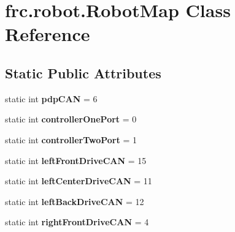 \hypertarget{classfrc_1_1robot_1_1_robot_map}{}\section{frc.\+robot.\+Robot\+Map Class Reference}
\label{classfrc_1_1robot_1_1_robot_map}
\subsection*{Static Public Attributes}
\begin{DoxyCompactItemize}
\item 
\mbox{\label{classfrc_1_1robot_1_1_robot_map_af7db1426412719318df15f9838b70198}} 
static int {\bfseries pdp\+C\+AN} = 6
\item 
\mbox{\label{classfrc_1_1robot_1_1_robot_map_adf0118e5a9de03d6f71ea1e5a6a81cc9}} 
static int {\bfseries controller\+One\+Port} = 0
\item 
\mbox{\label{classfrc_1_1robot_1_1_robot_map_a762ebcaa07378c37d88654506850e07f}} 
static int {\bfseries controller\+Two\+Port} = 1
\item 
\mbox{\label{classfrc_1_1robot_1_1_robot_map_a2e3dbfb148d6fa2b7f430614887217f0}} 
static int {\bfseries left\+Front\+Drive\+C\+AN} = 15
\item 
\mbox{\label{classfrc_1_1robot_1_1_robot_map_a9d04abf669a5ad42cb023e3ff3b56bcd}} 
static int {\bfseries left\+Center\+Drive\+C\+AN} = 11
\item 
\mbox{\label{classfrc_1_1robot_1_1_robot_map_a0f78f6850b0e060cc6acd88cc80ffa04}} 
static int {\bfseries left\+Back\+Drive\+C\+AN} = 12
\item 
\mbox{\label{classfrc_1_1robot_1_1_robot_map_a4ca461a7ad91df180971974fd6abc236}} 
static int {\bfseries right\+Front\+Drive\+C\+AN} = 4
\item 
\mbox{\label{classfrc_1_1robot_1_1_robot_map_a3ca36356410531e52126d2979ee17f13}} 

\end{DoxyCompactItemize}
